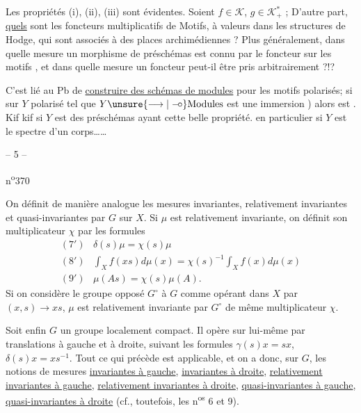 Les propriétés (i), (ii), (iii) sont évidentes. Soient $f\in\mathcal K$, $g\in\mathcal K^*_+$ ;
D'autre part, \uline{quels} sont les foncteurs multiplicatifs de Motifs, à valeurs dans les structures de Hodge,  qui sont associés à des places archimédiennes ? Plus généralement, dans quelle mesure un morphisme de préschémas  est connu par le foncteur sur les motifs , et dans quelle mesure un foncteur  peut-il être pris arbitrairement ?!?

C'est lié au Pb de \uline{construire des schémas de modules} pour les motifs polarisés; si sur $Y$  polarisé  tel que $Y\unsure{\longrightarrow|\mathrel{-\!\circ}}\text{Modules}$ est une immersion )  alors est . Kif kif si $Y$ est \uline{} des préschémas ayant cette belle propriété.  en particulier si $Y$ est le spectre d'un corps\ldots\ldots
{}
\begin{center}-- 5 --\end{center}\hfill n\textsuperscript{o}370

On définit de manière analogue les mesures invariantes, relativement invariantes et quasi-invariantes par $G$ sur $X$. Si $\mu$ est relativement invariante, on définit son multiplicateur $\chi$ par les formules
\[
\begin{array}{ll}
(7')&\delta(s)\mu=\chi(s)\mu\\
(8')&\displaystyle\int_X f(xs)d\mu(x)=\chi(s)^{-1}\int_X f(x)d\mu(x)\\
(9')&\mu(As)=\chi(s)\mu(A).
\end{array}
\]
Si on considère le groupe opposé $G^\circ$ à $G$ comme opérant dans $X$ par $(x,s)\longrightarrow xs$, $\mu$ est relativement invariante par $G^\circ$ de même multiplicateur $\chi$.

Soit enfin $G$ un groupe localement compact. Il opère sur lui-même par translations à gauche et à droite, suivant les formules $\gamma(s)x=sx$, $\delta(s)x=xs^{-1}$. Tout ce qui précède est applicable, et on a donc, sur $G$, les notions de mesures \uline{invariantes à gauche}, \uline{invariantes à droite}, \uline{relativement invariantes à gauche}, \uline{relativement invariantes à droite}, \uline{quasi-invariantes à gauche}, \uline{quasi-invariantes à droite} (cf., toutefois, les n\textsuperscript{os} 6 et 9).

